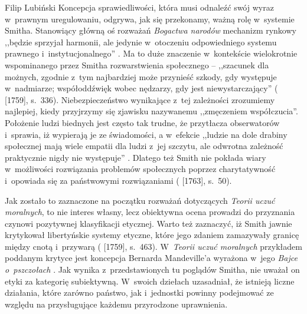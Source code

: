 \begin{artplenv}{Filip Lubiński}
Koncepcja sprawiedliwości, która musi odnaleźć swój wyraz w~prawnym uregulowaniu, odgrywa, jak się przekonamy, ważną
rolę w~systemie Smitha. Stanowiący główną oś rozważań \textit{Bogactwa narodów} mechanizm rynkowy ,,będzie sprzyjał
harmonii, ale jedynie w~otoczeniu odpowiedniego systemu prawnego i~instytucjonalnego''
\parencite[s.~83]{blaug_teoria_1994}.
Ma to duże znaczenie w~kontekście wielokrotnie wspominanego przez Smitha rozwarstwienia
społecznego -- ,,szacunek dla możnych, zgodnie z~tym najbardziej może przynieść szkody,
gdy występuje w~nadmiarze; współoddźwięk wobec
nędzarzy, gdy jest niewystarczający''
(\cite{smith_teoria_1989} [1759], s.~336).
Niebezpieczeństwo
wynikające z~tej zależności zrozumiemy najlepiej, kiedy przyjrzymy się zjawisku nazywanemu ,,zmęczeniem współczucia''.
Położenie ludzi biednych jest często tak trudne, że przytłacza obserwatorów i~sprawia, iż wypierają je ze świadomości,
a w~efekcie ,,ludzie na dole drabiny społecznej mają wiele empatii dla ludzi z~jej szczytu, ale odwrotna zależność
praktycznie nigdy nie występuje''
\parencite[s.~95]{graeber_utopia_2016}.
Dlatego też Smith nie pokłada
wiary w~możliwości rozwiązania problemów społecznych poprzez charytatywność i~opowiada się za państwowymi rozwiązaniami
(\cite{smith_lectures_1982} [1763], s.~50).

Jak zostało to zaznaczone na początku rozważań dotyczących \textit{Teorii uczuć moralnych}, to nie interes
własny, lecz obiektywna ocena prowadzi do przyznania czynowi pozytywnej klasyfikacji etycznej. Warto też zaznaczyć, iż
Smith jawnie krytykował libertyńskie systemy etyczne, które jego zdaniem zamazywały granicę między cnotą i~przywarą
(\cite{smith_teoria_1989} [1759], s.~463).
W~\textit{Teorii uczuć moralnych} przykładem poddanym krytyce
jest koncepcja Bernarda Mandeville'a wyrażona w~jego \textit{Bajce o~pszczołach}
\parencite[s.~186–188]{mandeville_bajka_1957}.
Jak wynika z~przedstawionych tu poglądów Smitha, nie uważał on etyki za kategorię subiektywną.
W~swoich dziełach uzasadniał, że istnieją liczne działania, które zarówno państwo, jak i~jednostki powinny podejmować ze
względu na przysługujące każdemu przyrodzone uprawnienia.


\end{artplenv}
